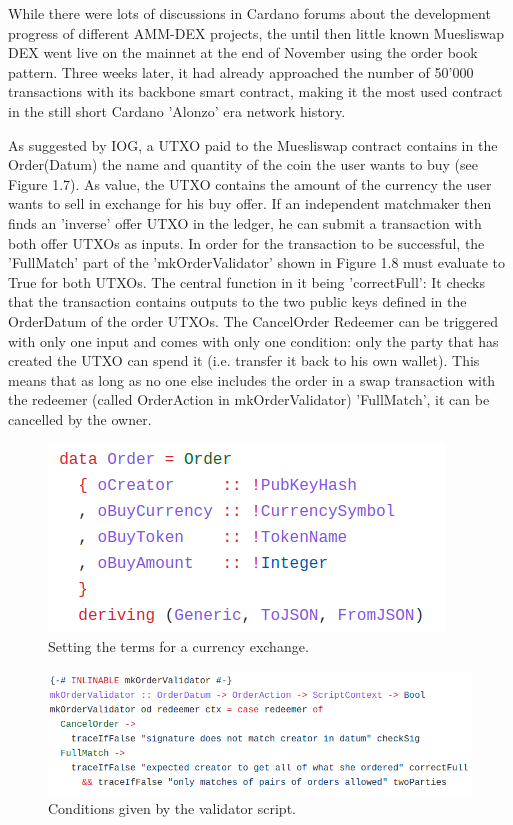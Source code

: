 \documentclass[a4paper,twoside,12pt]{report}
\begin{document}
While there were lots of discussions in Cardano forums about the development progress of different AMM-DEX projects, the until then little known Muesliswap DEX \cite{muesliswapDocs} went live on the mainnet at the end of November using the order book pattern. Three weeks later, it had already approached the number of 50'000 transactions with its backbone smart contract, making it the most used contract in the still short Cardano 'Alonzo' era network history.

As suggested by IOG, a UTXO paid to the Muesliswap contract contains in the Order(Datum) the name and quantity of the coin the user wants to buy (see Figure 1.7). As value, the UTXO contains the amount of the currency the user wants to sell in exchange for his buy offer. If an independent matchmaker then finds an 'inverse' offer UTXO in the ledger, he can submit a transaction with both offer UTXOs as inputs. In order for the transaction to be successful, the 'FullMatch' part of the 'mkOrderValidator' shown in Figure 1.8 must evaluate to True for both UTXOs. The central function in it being 'correctFull': It checks that the transaction contains outputs to the two public keys defined in the OrderDatum of the order UTXOs. The CancelOrder Redeemer can be triggered with only one input and comes with only one condition: only the party that has created the UTXO can spend it (i.e. transfer it back to his own wallet). This means that as long as no one else includes the order in a swap transaction with the redeemer (called OrderAction in mkOrderValidator)  'FullMatch', it can be cancelled by the owner.    

\begin{figure}[H]
\centering
\includegraphics[scale=0.5]{muesliswap_datum}
\caption{Setting the terms for a currency exchange.}
\end{figure}

\begin{figure}[H]
\centering
\includegraphics[scale=0.5]{muesliswap_validator}
\caption{Conditions given by the validator script.}
\end{figure} 
\end{document}
